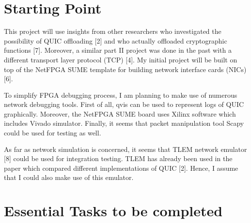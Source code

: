 \documentclass[a4paper,12pt]{article}
\begin{document}
\section*{Starting Point}
This project will use insights from other researchers who investigated the possibility of QUIC offloading [2] and who actually offloaded cryptographic functions [7].
Moreover, a similar part II project was done in the past with a different transport layer protocol (TCP) [4].
My initial project will be built on top of the NetFPGA SUME template for building network interface cards (NICs) [6].

To simplify FPGA debugging process, I am planning to make use of numerous network debugging tools. 
First of all, qvis can be used to represent logs of QUIC graphically.  
Moreover, the NetFPGA SUME board uses Xilinx software which includes Vivado simulator.  
Finally, it seems that packet manipulation tool Scapy could be used for testing as well.  
 
As far as network simulation is concerned, it seems that TLEM network emulator [8] could be used for integration testing. TLEM has already been used in the paper which compared different implementations of QUIC [2]. Hence, I assume that I could also make use of this emulator. 

\section*{Essential Tasks to be completed}
\end{document}
